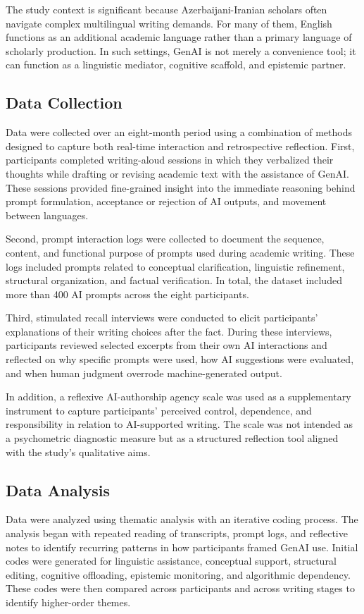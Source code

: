 \documentclass[12pt]{article}
\begin{document}
The study context is significant because Azerbaijani-Iranian scholars often navigate complex multilingual writing demands. For many of them, English functions as an additional academic language rather than a primary language of scholarly production. In such settings, GenAI is not merely a convenience tool; it can function as a linguistic mediator, cognitive scaffold, and epistemic partner.

\subsection{Data Collection}
Data were collected over an eight-month period using a combination of methods designed to capture both real-time interaction and retrospective reflection. First, participants completed writing-aloud sessions in which they verbalized their thoughts while drafting or revising academic text with the assistance of GenAI. These sessions provided fine-grained insight into the immediate reasoning behind prompt formulation, acceptance or rejection of AI outputs, and movement between languages.

Second, prompt interaction logs were collected to document the sequence, content, and functional purpose of prompts used during academic writing. These logs included prompts related to conceptual clarification, linguistic refinement, structural organization, and factual verification. In total, the dataset included more than 400 AI prompts across the eight participants.

Third, stimulated recall interviews were conducted to elicit participants' explanations of their writing choices after the fact. During these interviews, participants reviewed selected excerpts from their own AI interactions and reflected on why specific prompts were used, how AI suggestions were evaluated, and when human judgment overrode machine-generated output.

In addition, a reflexive AI-authorship agency scale was used as a supplementary instrument to capture participants' perceived control, dependence, and responsibility in relation to AI-supported writing. The scale was not intended as a psychometric diagnostic measure but as a structured reflection tool aligned with the study's qualitative aims.

\subsection{Data Analysis}
Data were analyzed using thematic analysis with an iterative coding process. The analysis began with repeated reading of transcripts, prompt logs, and reflective notes to identify recurring patterns in how participants framed GenAI use. Initial codes were generated for linguistic assistance, conceptual support, structural editing, cognitive offloading, epistemic monitoring, and algorithmic dependency. These codes were then compared across participants and across writing stages to identify higher-order themes.
\end{document}

